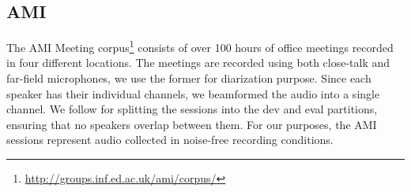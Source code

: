 \begin{table}[]
\caption{Statistics of corpora used for speaker verification, including trial subsets created for analysis purposes}
\label{tab:spkrVerDataStats}
\end{table}

\subsection{AMI}
The AMI Meeting corpus\footnote{\url{http://groups.inf.ed.ac.uk/ami/corpus/}} consists of over 100 hours of office meetings recorded in four different locations. The meetings are recorded using both close-talk and far-field  microphones, we use the former for diarization purpose. Since each speaker has their individual channels, we beamformed the audio into a single channel. We follow \cite{sun_2019,moni_clusterGAN} for splitting the sessions into the dev and eval partitions, ensuring that no speakers overlap between them. For our purposes, the AMI sessions represent audio collected in noise-free recording conditions.

